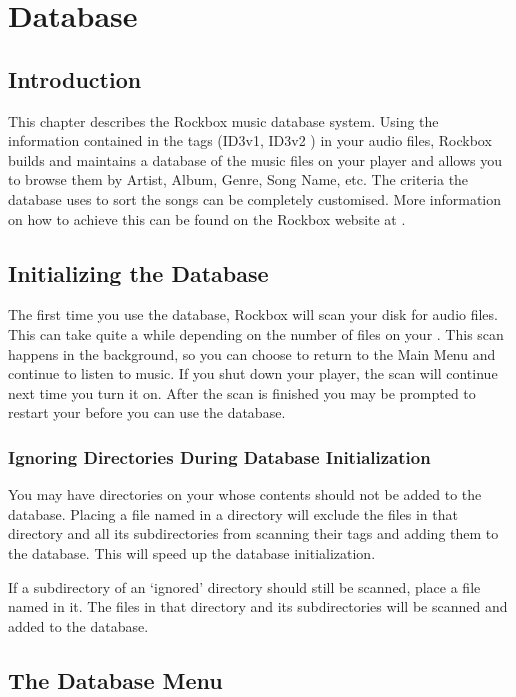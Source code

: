 \section{\label{ref:database}Database}

\subsection{Introduction}
This chapter describes the Rockbox music database system. Using the information
contained in the tags (ID3v1, ID3v2%
) in your audio files, Rockbox builds and maintains a database of the music
files on your player and allows you to browse them by Artist, Album, Genre, 
Song Name, etc.  The criteria the database uses to sort the songs can be completely
 customised. More information on how to achieve this can be found on the Rockbox
 website at . 

\subsection{Initializing the Database}
The first time you use the database, Rockbox will scan your disk for audio files.
This can take quite a while depending on the number of files on your \dap{}.
This scan happens in the background, so you can choose to return to the
Main Menu and continue to listen to music.
If you shut down your player, the scan will continue next time you turn it on.
After the scan is finished you may be prompted to restart your \dap{} before
you can use the database.

\subsubsection{Ignoring Directories During Database Initialization}

You may have directories on your \dap{} whose contents should not be added
to the database. Placing a file named  in a directory
will exclude the files in that directory and all its subdirectories from
scanning their tags and adding them to the database. This will speed up the
database initialization.

If a subdirectory of an `ignored' directory should still be scanned, place a
file named  in it. The files in that directory and
its subdirectories will be scanned and added to the database.

\subsection{\label{ref:databasemenu}The Database Menu}

